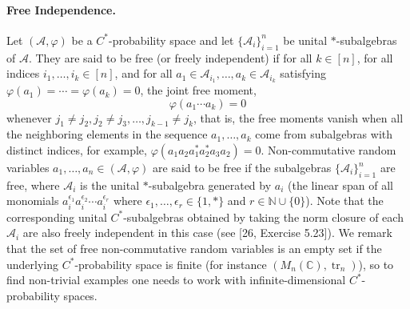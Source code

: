 \documentclass[10pt,a4paper]{article}
\begin{document}
\paragraph{Free Independence.}
Let $(\mathcal A,\varphi)$ be a $C^*$-probability space and let $\{\mathcal A_i\}_{i=1}^n$ be unital $*$-subalgebras of $\mathcal A$. They are said to be free (or freely independent) if for all $k\in[n]$, for all indices $i_1,\ldots,i_k\in[n]$, and for all $a_1\in\mathcal A_{i_1},\ldots,a_k\in\mathcal A_{i_k}$ satisfying $\varphi(a_1)=\cdots=\varphi(a_k)=0$, the joint free moment,
\[\varphi(a_1\cdots a_k)=0\]
whenever $j_1\neq j_2,j_2\neq j_3,\ldots,j_{k-1}\neq j_k$, that is, the free moments vanish when all the neighboring elements in the sequence $a_1,\ldots,a_k$ come from subalgebras with distinct indices, for example, $\varphi(a_1a_2a_1^*a_2^*a_3a_2)=0$.
Non-commutative random variables $a_1,\ldots,a_n\in(\mathcal A,\varphi)$ are said to be free if the subalgebras $\{\mathcal A_i\}_{i=1}^n$ are free, where $\mathcal A_i$ is the unital $*$-subalgebra generated by $a_i$ (the linear span of all monomials $a_i^{\epsilon_1}a_i^{\epsilon_2}\cdots a_i^{\epsilon_r}$ where $\epsilon_1,\ldots,\epsilon_r\in\{1,*\}$ and $r\in\mathbb N\cup\{0\}$). Note that the corresponding unital $C^*$-subalgebras obtained by taking the norm closure of each $\mathcal A_i$ are also freely independent in this case (see [26, Exercise 5.23]).
We remark that the set of free non-commutative random variables is an empty set if the underlying $C^*$-probability space is finite (for instance $(M_n(\mathbb C),\operatorname{tr}_n)$), so to find non-trivial examples one needs to work with infinite-dimensional $C^*$-probability spaces.
\end{document}
